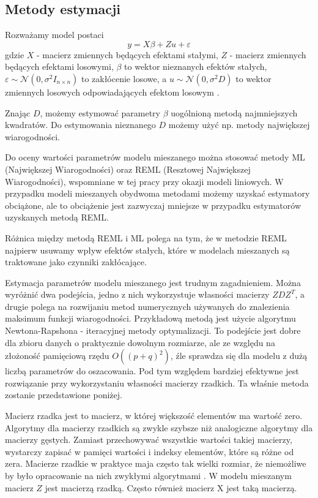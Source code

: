 \documentclass[12pt]{mwbk}
\theoremstyle{plain}
\theoremstyle{definition}
\theoremstyle{remark}
\begin{document}
\subsection{Metody estymacji}

Rozważamy model postaci
$$y=X\beta +Z u + \varepsilon$$
gdzie $X$ - macierz zmiennych będących efektami stałymi, $Z$ - macierz zmiennych będących efektami losowymi, $\beta$ to wektor nieznanych efektów stałych, $\varepsilon \sim \mathcal{N}(0, \sigma^2 I_{n\times n})$ to zakłócenie losowe, a $u \sim \mathcal{N} (0, \sigma^2D)$ to wektor zmiennych losowych odpowiadających efektom losowym \cite{biecek}.

Znając $D$, możemy estymować parametry $\beta$ uogólnioną metodą najmniejszych kwadratów. Do estymowania nieznanego $D$ możemy użyć np. metody największej wiarogodności.

Do oceny wartości parametrów modelu mieszanego można stosować metody ML (Największej Wiarogodności) oraz REML (Resztowej Największej Wiarogodności), wspomniane w tej pracy przy okazji modeli liniowych. W przypadku modeli mieszanych obydwoma metodami możemy uzyskać estymatory obciążone, ale to obciążenie jest zazwyczaj mniejsze w przypadku estymatorów uzyskanych metodą REML.

Różnica między metodą REML i ML polega na tym, że w metodzie REML najpierw usuwamy wpływ efektów stałych, które w modelach mieszanych są traktowane jako czynniki zakłócające.

Estymacja parametrów modelu mieszanego jest trudnym zagadnieniem. Można wyróżnić dwa podejścia, jedno z nich wykorzystuje własności macierzy $ZDZ^T$, a drugie polega na rozwijaniu metod numerycznych używanych do znalezienia maksimum funkcji wiarogodności. Przykładową metodą jest użycie algorytmu Newtona-Rapshona - iteracyjnej metody optymalizacji. To podejście jest dobre dla zbioru danych o praktycznie dowolnym rozmiarze, ale ze względu na złożoność pamięciową rzędu $O((p+q)^2)$, źle sprawdza się dla modelu z dużą liczbą parametrów do oszacowania. Pod tym względem bardziej efektywne jest rozwiązanie przy wykorzystaniu własności macierzy rzadkich. Ta właśnie metoda zostanie przedstawione poniżej.

Macierz rzadka jest to macierz, w której większość elementów ma wartość zero. Algorytmy dla macierzy rzadkich są zwykle szybsze niż analogiczne algorytmy dla macierzy gęstych. Zamiast przechowywać wszystkie wartości takiej macierzy, wystarczy zapisać w pamięci wartości i indeksy elementów, które są różne od zera. Macierze rzadkie w praktyce maja często tak wielki rozmiar, że niemożliwe by było opracowanie na nich zwykłymi algorytmami \cite{rzadka}. W modelu mieszanym macierz $Z$ jest macierzą rzadką. Często również macierz X jest taką macierzą.
\end{document}
